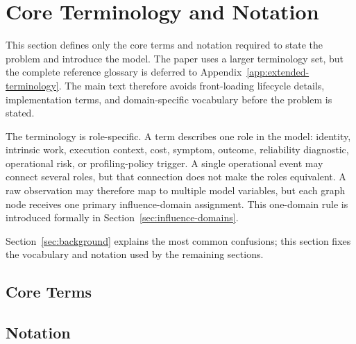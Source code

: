 \section{Core Terminology and Notation}
\label{sec:terminology-notation}

This section defines only the core terms and notation required to state the
problem and introduce the model. The paper uses a larger terminology set, but
the complete reference glossary is deferred to
Appendix~\ref{app:extended-terminology}. The main text therefore avoids
front-loading lifecycle details, implementation terms, and domain-specific
vocabulary before the problem is stated.

The terminology is role-specific. A term describes one role in the model:
identity, intrinsic work, execution context, cost, symptom, outcome, reliability
diagnostic, operational risk, or profiling-policy trigger. A single operational
event may connect several roles, but that connection does not make the roles
equivalent. A raw observation may therefore map to multiple model variables, but
each graph node receives one primary influence-domain assignment. This
one-domain rule is introduced formally in
Section~\ref{sec:influence-domains}.

Section~\ref{sec:background} explains the most common confusions; this section
fixes the vocabulary and notation used by the remaining sections.

\subsection{Core Terms}
\label{sec:core-terms}


\subsection{Notation}
\label{sec:terminology-symbols}

